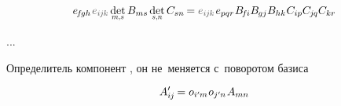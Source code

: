 \[
e_{\hspace{-0.25ex}f\hspace{-0.2ex}gh} \hspace{.2ex} \mathcolor{black!66}{e_{i\hspace{-0.1ex}j\hspace{-0.1ex}k}} \hspace{.33ex} \underset{\raisebox{.15em}{\scalebox{.7}{$m$,$s$}}}{\operatorname{det}} \, \somematrixelements{ms} \hspace{.33ex} \underset{\raisebox{.15em}{\scalebox{.7}{$s$,$n$}}}{\operatorname{det}} \, C_{sn} \hspace{-0.2ex}
= \mathcolor{black!66}{e_{i\hspace{-0.1ex}j\hspace{-0.1ex}k}} \hspace{.2ex} e_{pqr} \hspace{.1ex} \somematrixelements{\hspace{-0.25ex}f\hspace{-0.1ex}i} \somematrixelements{\hspace{-0.1ex}gj} \somematrixelements{hk} \hspace{.1ex} C_{ip} C_{\hspace{-0.1ex}j\hspace{-0.1ex}q} C_{kr}
\hspace{-0.2ex}
\]

...

\begin{otherlanguage}{russian}

Определитель
компонент
,
он
не~меняется
с~поворотом базиса

\end{otherlanguage}

\nopagebreak\vspace{-0.2em}\begin{equation*}
A'_{i\hspace{-0.1ex}j} \hspace{-0.16ex} = o_{i'\hspace{-0.1ex}m} \hspace{.1ex} o_{j'\hspace{-0.1ex}n} \hspace{.16ex} A_{mn}
\end{equation*}
